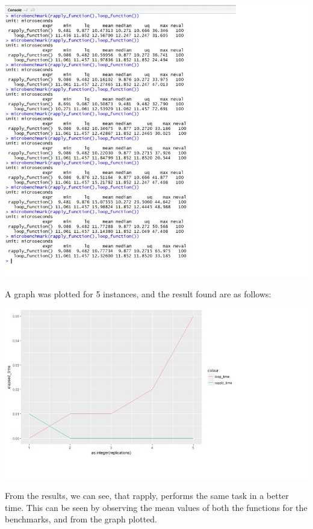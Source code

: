 \documentclass{article}
\begin{document}
	\begin{center}
		\includegraphics{benchmark_rapply.jpg}	
	\end{center}

	

	A graph was plotted for 5 instances, and the result found are as follows:
	
	\begin{center}
		\includegraphics{plot_rapply.jpg}
	\end{center}
	
	From the results, we can see, that rapply, performs the same task in a better time. This can be seen by observing the mean values of both the functions for the benchmarks, and from the graph plotted.
    \pagebreak
	
\end{document}
